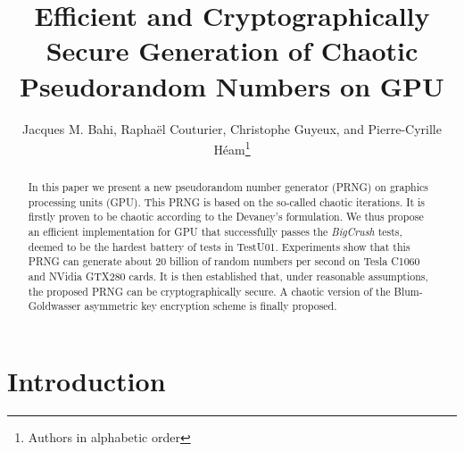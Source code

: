 \documentclass{article}
\title{Efficient and Cryptographically Secure Generation of Chaotic Pseudorandom Numbers on GPU}
\begin{document}
\author{Jacques M. Bahi, Rapha\"{e}l Couturier,  Christophe
Guyeux, and Pierre-Cyrille Héam\thanks{Authors in alphabetic order}}
   
\maketitle

\begin{abstract}
In this paper we present a new pseudorandom number generator (PRNG) on
graphics processing units  (GPU). This PRNG is based  on the so-called chaotic iterations.  It
is firstly proven  to be chaotic according to the Devaney's  formulation. We thus propose  an efficient
implementation  for  GPU that successfully passes the   {\it BigCrush} tests, deemed to be the  hardest
battery of tests in TestU01.  Experiments show that this PRNG can generate
about 20 billion of random numbers  per second on Tesla C1060 and NVidia GTX280
cards.
It is then established that, under reasonable assumptions, the proposed PRNG can be cryptographically 
secure.
A chaotic version of the Blum-Goldwasser asymmetric key encryption scheme is finally proposed.


\end{abstract}

\section{Introduction}
\end{document}
